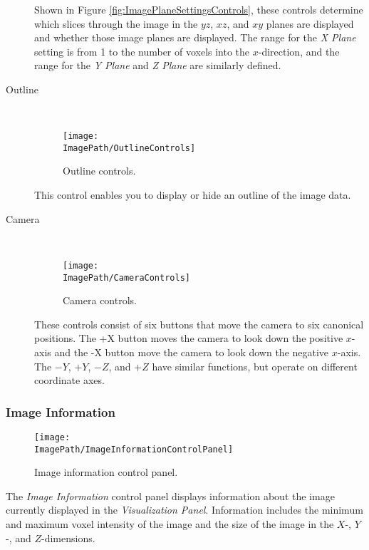 \documentclass[11pt,titlepage,twoside]{article}
\begin{document}
\begin{description}
  Shown in Figure \ref{fig:ImagePlaneSettingsControls}, these controls determine which slices through the image in the $yz$, $xz$, and $xy$ planes are displayed and whether those image planes are displayed. The range for the \emph{X Plane} setting is from 1 to the number of voxels into the $x$-direction, and the range for the \emph{Y Plane} and \emph{Z Plane} are similarly defined.

  \item[Outline] \hfill \\
  
  \begin{figure}[h]
    \centering
    \texttt{[image: \\ImagePath/OutlineControls]}
    \caption{Outline controls.}
    \label{fig:OutlineControls}
  \end{figure}
  
  
  This control enables you to display or hide an outline of the image data.

  \item[Camera] \hfill \\
  
  \begin{figure}[h]
    \centering
    \texttt{[image: \\ImagePath/CameraControls]}
    \caption{Camera controls.}
    \label{fig:CameraControls}
  \end{figure}
  
  These controls consist of six buttons that move the camera to six canonical positions. The +X button moves the camera to look down the positive $x$-axis and the -X button move the camera to look down the negative $x$-axis. The $-Y$, $+Y$, $-Z$, and $+Z$ have similar functions, but operate on different coordinate axes.

\end{description}

\subsubsection{Image Information}

  \begin{figure}[h]
    \centering
    \texttt{[image: \\ImagePath/ImageInformationControlPanel]}
    \caption{Image information control panel.}
    \label{fig:ImageInformationControlPanel}
  \end{figure}


The \emph{Image Information} control panel displays information about the image currently displayed in the \emph{Visualization Panel}. Information includes the minimum and maximum voxel intensity of the image and the size of the image in the $X$-, $Y$-, and $Z$-dimensions.
\end{document}
